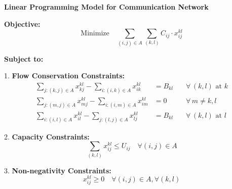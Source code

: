 \documentclass{article}
\begin{document}
\textbf{Linear Programming Model for Communication Network}

\textbf{Objective:}
\[
\text{Minimize} \quad \sum_{(i,j) \in A} \sum_{(k,l)} C_{ij} \cdot x_{ij}^{kl}
\]

\textbf{Subject to:}

1. \textbf{Flow Conservation Constraints:}
\begin{align*}
\sum_{j: (k, j) \in A} x_{kj}^{kl} - \sum_{i: (i, k) \in A} x_{ik}^{kl} &= B_{kl} \quad &\forall \, (k,l) \text{ at } k \\
\sum_{j: (m, j) \in A} x_{mj}^{kl} - \sum_{i: (i, m) \in A} x_{im}^{kl} &= 0 \quad &\forall \, m \neq k, l \\
\sum_{i: (i, l) \in A} x_{il}^{kl} - \sum_{j: (l, j) \in A} x_{lj}^{kl} &= B_{kl} \quad &\forall \, (k,l) \text{ at } l
\end{align*}

2. \textbf{Capacity Constraints:}
\[
\sum_{(k,l)} x_{ij}^{kl} \leq U_{ij} \quad \forall (i, j) \in A
\]

3. \textbf{Non-negativity Constraints:}
\[
x_{ij}^{kl} \geq 0 \quad \forall (i, j) \in A, \forall (k, l)
\]
\end{document}
